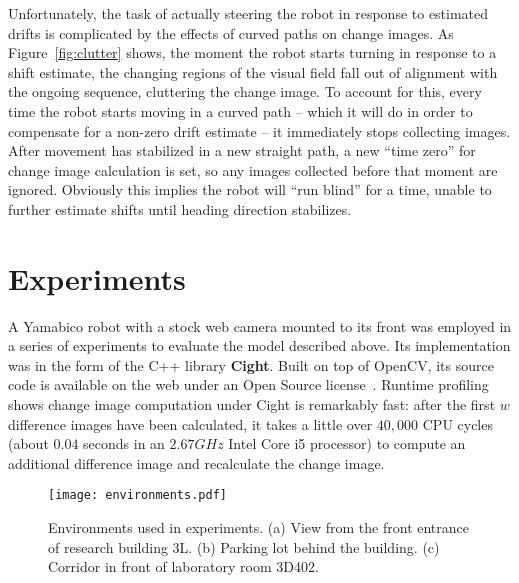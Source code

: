 \documentclass[twocolumn, 9pt,fleqn]{jsproceedings}
\begin{document}
Unfortunately, the task of actually steering the robot in response to estimated drifts is complicated by the effects of curved paths on change images. As Figure~\ref{fig:clutter} shows, the moment the robot starts turning in response to a shift estimate, the changing regions of the visual field fall out of alignment with the ongoing sequence, cluttering the change image. To account for this, every time the robot starts moving in a curved path -- which it will do in order to compensate for a non-zero drift estimate -- it immediately stops collecting images. After movement has stabilized in a new straight path, a new ``time zero'' for change image calculation is set, so any images collected before that moment are ignored. Obviously this implies the robot will ``run blind'' for a time, unable to further estimate shifts until heading direction stabilizes.

\section{Experiments}

A Yamabico robot with a stock web camera mounted to its front was employed in a series of experiments to evaluate the model described above. Its implementation was in the form of the C++ library \textbf{Cight}. Built on top of OpenCV, its source code is available on the web under an Open Source license~\cite{HEL14c}. Runtime profiling shows change image computation under Cight is remarkably fast: after the first $w$ difference images have been calculated, it takes a little over $40,000$ CPU cycles (about $0.04$ seconds in an $2.67GHz$ Intel Core i5 processor) to compute an additional difference image and recalculate the change image.

\begin{figure}[b]
\texttt{[image: environments.pdf]}
\caption{Environments used in experiments. (a) View from the front entrance of research building 3L. (b) Parking lot behind the building. (c) Corridor in front of laboratory room 3D402.}
\label{fig:environments}
\end{figure}
\end{document}
